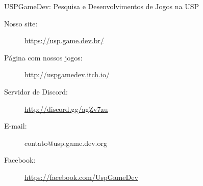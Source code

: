 \begin{subsecao}{USPGameDev: Pesquisa e Desenvolvimentos de Jogos na USP}
\begin{description}
  \item[Nosso site:] \url{https://usp.game.dev.br/}
  \item[Página com nossos jogos:] \url{http://uspgamedev.itch.io/}
  \item[Servidor de Discord:] \url{http://discord.gg/agZv7zu}
  \item[E-mail:] contato@usp.game.dev.org
  \item[Facebook:] \url{https://facebook.com/UspGameDev}
\end{description}

\end{subsecao}
